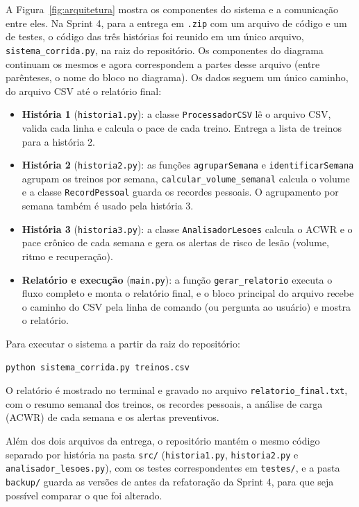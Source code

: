 \documentclass[12pt,a4paper]{article}
\begin{document}
A Figura~\ref{fig:arquitetura} mostra os componentes do sistema e a comunicação entre
eles. Na Sprint 4, para a entrega em \texttt{.zip} com um arquivo de código e um de
testes, o código das três histórias foi reunido em um único arquivo,
\texttt{sistema\_corrida.py}, na raiz do repositório. Os componentes do diagrama
continuam os mesmos e agora correspondem a partes desse arquivo (entre parênteses, o
nome do bloco no diagrama). Os dados seguem um único caminho, do arquivo CSV até o
relatório final:

\begin{itemize}[itemsep=0.3em]
  \item \textbf{História 1} (\texttt{historia1.py}): a classe \texttt{ProcessadorCSV} lê o
        arquivo CSV, valida cada linha e calcula o pace de cada treino. Entrega a lista
        de treinos para a história 2.
  \item \textbf{História 2} (\texttt{historia2.py}): as funções \texttt{agruparSemana} e
        \texttt{identificarSemana} agrupam os treinos por semana,
        \texttt{calcular\_volume\_semanal} calcula o volume e a classe
        \texttt{RecordPessoal} guarda os recordes pessoais. O agrupamento por semana
        também é usado pela história 3.
  \item \textbf{História 3} (\texttt{historia3.py}): a
        classe \texttt{AnalisadorLesoes} calcula o ACWR e o pace crônico de cada semana e
        gera os alertas de risco de lesão (volume, ritmo e recuperação).
  \item \textbf{Relatório e execução} (\texttt{main.py}): a função
        \texttt{gerar\_relatorio} executa o fluxo completo e monta o relatório final, e o
        bloco principal do arquivo recebe o caminho do CSV pela linha de comando (ou
        pergunta ao usuário) e mostra o relatório.
\end{itemize}

Para executar o sistema a partir da raiz do repositório:

\begin{verbatim}
python sistema_corrida.py treinos.csv
\end{verbatim}

O relatório é mostrado no terminal e gravado no arquivo \texttt{relatorio\_final.txt},
com o resumo semanal dos treinos, os recordes pessoais, a análise de carga (ACWR) de cada
semana e os alertas preventivos.

Além dos dois arquivos da entrega, o repositório mantém o mesmo código separado por
história na pasta \texttt{src/} (\texttt{historia1.py}, \texttt{historia2.py} e
\texttt{analisador\_lesoes.py}), com os testes correspondentes em \texttt{testes/}, e a
pasta \texttt{backup/} guarda as versões de antes da refatoração da Sprint 4, para que
seja possível comparar o que foi alterado.
\end{document}
